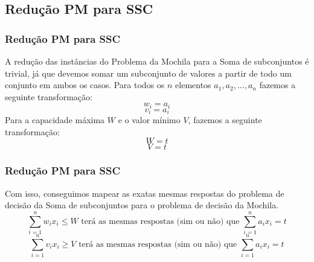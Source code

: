 \documentclass{beamer}
\begin{document}
\subsection{Redução PM para SSC}
\begin{frame}
    \frametitle{Redução PM para SSC}
        A redução das instâncias do Problema da Mochila para a Soma de subconjuntos é trivial, já que devemos somar um subconjunto de valores a partir de todo um conjunto em ambos os casos.
        \newline
        \newline
        Para todos os $n$ elementos $a_{1}, a_{2}, ..., a_{n}$ fazemos a seguinte transformação:
        \begin{equation*}
            w_{i} = a_{i}
        \end{equation*}
        \begin{equation*}
            v_{i} = a_{i}
        \end{equation*}
        Para a capacidade máxima $W$ e o valor mínimo $V$, fazemos a seguinte transformação:
        \begin{equation*}
            W = t
        \end{equation*}
        \begin{equation*}
            V = t
        \end{equation*}
        
\end{frame}

\begin{frame}
    \frametitle{Redução PM para SSC}
        Com isso, conseguimos mapear as exatas mesmas respostas do problema de decisão da Soma de subconjuntos para o problema de decisão da Mochila.
         \begin{equation*}
            \sum_{i=1}^{n} w_{i} x_{i} \leq W \mbox{ terá as mesmas respostas (sim ou não) que } \sum_{i=1}^{n} a_{i} x_{i} = t
         \end{equation*}
         \begin{equation*}
            \sum_{i=1}^{n} v_{i} x_{i} \geq V \mbox{ terá as mesmas respostas (sim ou não) que } \sum_{i=1}^{n} a_{i} x_{i} = t
         \end{equation*}
\end{frame}
\end{document}
